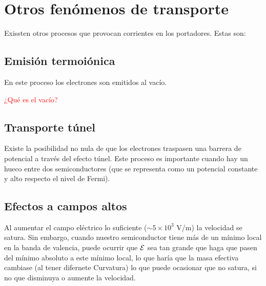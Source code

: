 

\section{Otros fenómenos de transporte}

Exissten otros procesos que provocan corrientes en los portadores. Estas son:

\subsection{Emisión termoiónica}

En este proceso los electrones son emitidos al vacío.

\begin{Anotacion}
	\textcolor{red}{¿Qué es el vacío?}
\end{Anotacion}

\subsection{Transporte túnel}

Existe la posibilidad no nula de que los electrones traspasen una barrera de potencial a través del efecto túnel. Este proceso es importante cuando hay un hueco entre dos semiconductores (que se representa como un potencial constante y alto respecto el nivel de Fermi). 


\subsection{Efectos a campos altos}

Al aumentar el campo eléctrico lo suficiente ($\sim 5 \times 10^3$ V/m) la velocidad se satura. Sin embargo, cuando nuestro semiconductor tiene más de un mínimo local en la banda de valencia, puede ocurrir que $\mathcal{E}$ sea tan grande que haga que pasen del mínimo absoluto a este mínimo local, lo que haría que la masa efectiva cambiase (al tener difernete Curvatura) lo que puede ocasionar que no satura, si no que disminuya o aumente la velocidad.



